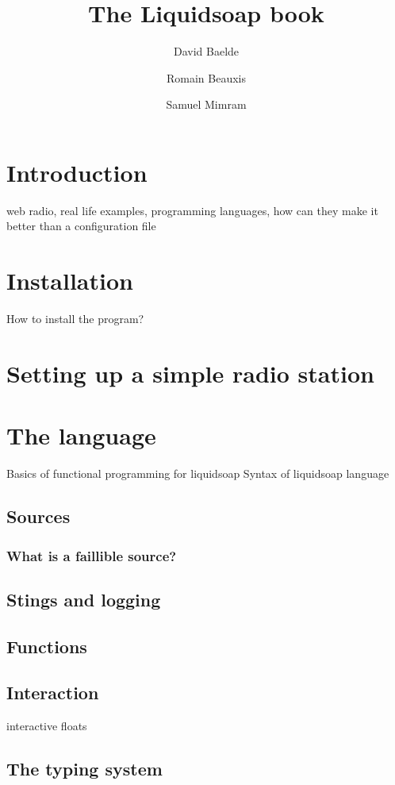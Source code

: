 \documentclass{book}
\title{The Liquidsoap book}
\author{David Baelde \and Romain Beauxis \and Samuel Mimram}
\begin{document}
\maketitle

\tableofcontents

\chapter{Introduction}
web radio, real life examples, programming languages, how can they make it
better than a configuration file

\chapter{Installation}
How to install the program?

\chapter{Setting up a simple radio station}

\chapter{The language}
Basics of functional programming for liquidsoap
Syntax of liquidsoap language

\section{Sources}
\subsection{What is a faillible source?}

\section{Stings and logging}

\section{Functions}

\section{Interaction}
interactive floats

\section{The typing system}
\end{document}
